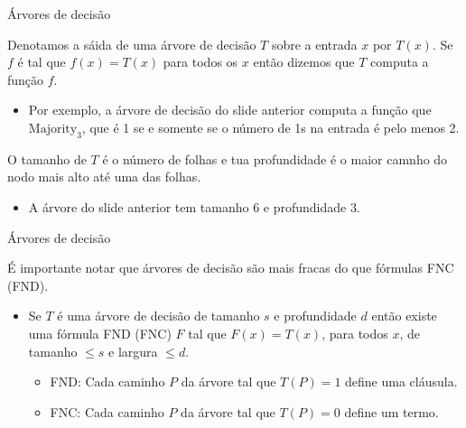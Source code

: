 \documentclass[landscape]{beamer}
\newcommand{\Majority}{\text{Majority}}
\begin{document}
\begin{frame}{Árvores de decisão}

Denotamos a sáida de uma árvore de decisão $T$ sobre a entrada $x$ por $T(x)$. Se $f$ é tal que $f(x) = T(x)$ para todos os $x$ então dizemos que $T$ computa a função $f$.

\begin{itemize}

	\item Por exemplo, a árvore de decisão do slide anterior computa a função que $\Majority_{3}$, que é 1 se e somente se o número de 1s na entrada é pelo menos 2.

\end{itemize}

O tamanho de $T$ é o número de folhas e tua profundidade é o maior camnho do nodo mais alto até uma das folhas.

\begin{itemize}

	\item A árvore do slide anterior tem tamanho 6 e profundidade 3.

\end{itemize}

\end{frame}


\begin{frame} {Árvores de decisão}

É importante notar que árvores de decisão são mais fracas do que fórmulas FNC (FND).

\begin{itemize}

	\item Se $T$ é uma árvore de decisão de tamanho $s$ e profundidade $d$ então existe uma fórmula FND (FNC) $F$ tal que  $F(x) = T(x)$, para todos $x$, de tamanho $\leq s$ e largura $\leq d$.
	
	\begin{itemize}

		\item FND: Cada caminho $P$ da árvore tal que $T(P) = 1$ define uma cláusula.

		\item FNC: Cada caminho $P$ da árvore tal que $T(P) = 0$ define um termo.
	
	\end{itemize}

\end{itemize}

\end{frame}
\end{document}
